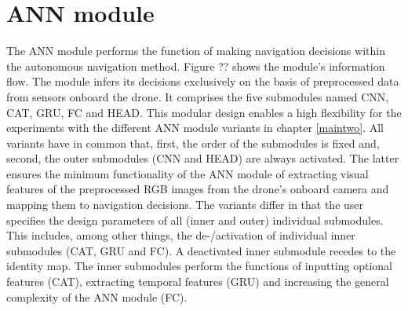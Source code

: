 \section{ANN module}\label{sec:ann_module}
%
%
\newcommand{\setOfAllPosInts}{\mathbb{N}_{>0}}
\newcommand{\setOfInts}[1]{\left\{ #1 \right\}}
\newcommand{\setOfAllRealNumbers}{\mathbb{R}}
\newcommand{\placeholder}{\square}
\newcommand{\floor}[1]{\left\lfloor #1 \right\rfloor}
\newcommand{\series}[1]{\left(#1\right)}
\newcommand{\tuple}[1]{\left(#1\right)}
%
\newcommand{\rawRGB}{\img[]{\camera}{}{}{}}
\newcommand{\rawRGBFullInt}{\num[]{\camera}{\mxm}{}{}}
\newcommand{\rawRGBHeight}{\num[]{\camera}{\height}{}{}}
\newcommand{\rawRGBWidth}{\num[]{\camera}{\widthh}{}{}}
\newcommand{\rawRGBTimeStep}{\dur[]{\camera}{}{}{}}
\newcommand{\preprocRGB}[1]{\img[]{\preprocessed}{#1}{}{}}
\newcommand{\IMULinAcc}{\acc[\hat]{\imu}{}{\lrs}{}}
\newcommand{\IMUAngVel}{\angvel[\hat]{\imu}{}{\lrs}{}}
\newcommand{\IMUTimeStep}{\dur[]{\imu}{}{}{}}
\newcommand{\optFeatVec}[1]{\featvec[]{\optional}{#1}{}{}}
\newcommand{\CNNMap}{\Func[\user]{\cnn}{}{}{}}
\newcommand{\CNNNumC}{\num[]{\cnn}{\channel}{}{}}
\newcommand{\CNNHeight}{\num[]{\cnn}{\height}{}{}}
\newcommand{\CNNWidth}{\num[]{\cnn}{\widthh}{}{}}
\newcommand{\CNNOutp}{\num[]{\cnn}{\outp}{}{}}
\newcommand{\visFeatVec}[1]{\featvec[]{\visual}{#1}{}{}}
\newcommand{\CNNNumP}{\num[]{\cnn}{\params}{}{}}
\newcommand{\CATMap}{\Func[]{\cat}{}{}{}}
\newcommand{\CATInp}[1]{\num[]{\cat}{#1}{}{}}
\newcommand{\CATNumP}{\num[]{\cat}{\params}{}{}}
%
\newcommand{\batchSize}{\num[\user]{\batch}{}{}{}}
\newcommand{\seqLen}{\num[\user]{\seq}{}{}{}}
\newcommand{\mainFreq}{\freq[\user]{\main}{}{}{}}
\newcommand{\resizeFact}{\anything[\user]{\cnn}{\text{resize}}{}{}{s}}
%
%
The ANN module performs the function of making navigation decisions
within the autonomous navigation method.
Figure ?? shows the module's information flow.
The module infers its decisions exclusively 
on the basis of preprocessed data from sensors onboard the drone.
It comprises the five submodules named
CNN, CAT, GRU, FC and HEAD.
This modular design enables a high flexibility for the experiments
with the different ANN module variants in chapter \ref{maintwo}.
All variants have in common that,
first, the order of the submodules is fixed
and, second, the outer submodules (CNN and HEAD)
are always activated.
The latter ensures the minimum functionality of the ANN module
of extracting visual features of the preprocessed 
RGB images from the drone's onboard camera
and mapping them to navigation decisions.
The variants differ in that
the user specifies the design parameters of 
all (inner and outer) individual submodules.
This includes, among other things, the de-/activation 
of individual inner submodules 
(CAT, GRU and FC).
A deactivated inner submodule recedes to the identity map.
The inner submodules perform the functions of
inputting optional features (CAT),
extracting temporal features (GRU)
and increasing the general complexity of the ANN module (FC).


